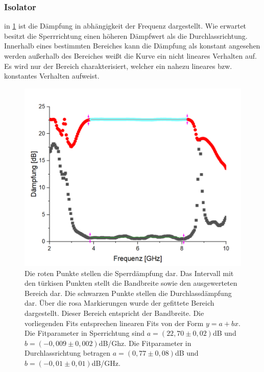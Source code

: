 \subsubsection{Isolator}
in \cref{Isolator} ist die Dämpfung in abhängigkeit der Frequenz dargestellt. Wie erwartet besitzt die Sperrrichtung einen höheren Dämpfwert als die Durchlassrichtung. Innerhalb eines bestimmten Bereiches kann die Dämpfung als konstant angesehen werden außerhalb des Bereiches weißt die Kurve ein nicht lineares Verhalten auf. Es wird nur der Bereich charakterisiert, welcher ein nahezu lineares bzw. konstantes Verhalten aufweist.
\begin{figure}[h!]
	\centering
	\includegraphics[scale = 1]{Isolator11.png}
	\caption{Die roten Punkte stellen die Sperrdämpfung dar. Das Intervall mit den türkisen Punkten stellt die Bandbreite sowie den ausgewerteten Bereich dar. Die schwarzen Punkte stellen die Durchlassdämpfung dar. Über die rosa Markierungen wurde der gefittete Bereich dargestellt. Dieser Bereich entspricht der Bandbreite. Die vorliegenden Fits entsprechen linearen Fits von der Form $y = a + bx$. Die Fitparameter in Sperrichtung sind $a = (22,70 \pm 0,02)$dB und $b = (-0,009 \pm 0,002)$dB/Ghz. Die Fitparameter in Durchlassrichtung betragen $a = (0,77 \pm 0,08)$dB und $b = (-0,01 \pm 0,01)$dB/GHz.}
	\label{Isolator}
\end{figure}
